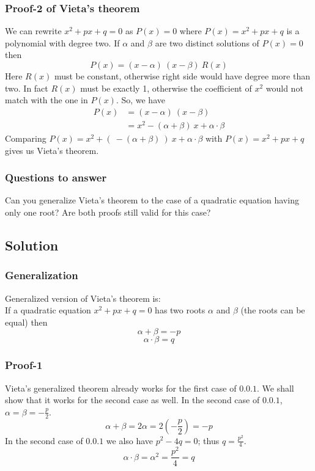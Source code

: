 \documentclass[12pt]{article}
\begin{document}
\subsubsection{Proof-2 of Vieta's theorem}
We can rewrite $x^2 + px + q = 0$ as $P(x) = 0$ where $P(x) = x^2 + px + q$ is a polynomial with degree two. If $\alpha$ and $\beta$ are two distinct solutions of $P(x) = 0$ then
\[
	P(x) = (x-\alpha)\ (x-\beta)\ R(x)
\]
Here $R(x)$ must be constant, otherwise right side would have degree more than two. In fact $R(x)$ must be exactly 1, otherwise the coefficient of $x^2$ would not match with the one in $P(x)$. So, we have
\begin{equation*}
	\begin{aligned}
		P(x) &= (x - \alpha)\ (x - \beta)\\
			 &= x^2 -(\alpha + \beta)\ x + \alpha \cdot \beta
	\end{aligned}
\end{equation*}
Comparing $P(x) = x^2 + (\ -(\alpha+\beta)\ )\ x + \alpha \cdot \beta$ with $P(x) = x^2 + px + q$ gives us Vieta's theorem.

\subsubsection{Questions to answer}
Can you generalize Vieta's theorem to the case of a quadratic equation having only one root? Are both proofs still valid for this case?

\subsection{Solution}
\subsubsection{Generalization}
Generalized version of Vieta's theorem is:\\

If a quadratic equation $x^2 + px + q = 0$ has two roots $\alpha$ and $\beta$ (the roots can be equal) then
\[
	\alpha + \beta = -p
\]
\[
	\alpha \cdot \beta = q
\]

\subsubsection{Proof-1}
Vieta's generalized theorem already works for the first case of $0.0.1$. We shall show that it works for the second case as well. In the second case of $0.0.1$, $\alpha = \beta = -\frac{p}{2}$.
\[
	\alpha + \beta = 2\alpha = 2 \left( -\frac{p}{2} \right) = -p
\]
In the second case of $0.0.1$ we also have $p^2-4q = 0$; thus $q = \frac{p^2}{4}$.
\[
	\alpha \cdot \beta = \alpha^2 = \frac{p^2}{4} = q
\]
\end{document}
